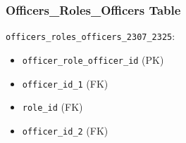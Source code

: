 \documentclass{article}
\begin{document}
\begin{minipage}{0.5\textwidth}
    \subsubsection*{Officers\_Roles\_Officers Table}
    \texttt{officers\_roles\_officers\_2307\_2325}:
    \begin{itemize}
        \item \texttt{officer\_role\_officer\_id} (PK)
        \item \texttt{officer\_id\_1} (FK)
        \item \texttt{role\_id} (FK)
        \item \texttt{officer\_id\_2} (FK)
    \end{itemize}

\end{minipage}
\hspace{0.05\textwidth}
\end{document}

